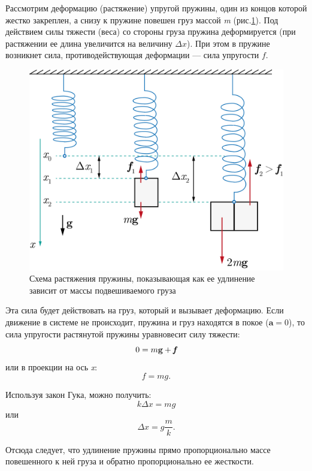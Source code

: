 \documentclass[All.tex]{subfiles}
\begin{document}
Рассмотрим деформацию (растяжение) упругой пружины, один из концов которой жестко закреплен, а снизу к пружине повешен груз массой \textit{m} (рис.\ref{Hooke-3}).
Под действием силы тяжести (веса) со стороны груза пружина деформируется (при растяжении ее длина увеличится на величину $ \Delta x $).
При этом в пружине возникнет сила, противодействующая деформации — сила упругости $ f $.

\begin{figure}[H] 
	\centering 	
	\includegraphics[width=0.6\linewidth]{Hooke-3.png}
	\caption{Схема растяжения пружины, показывающая как ее удлинение зависит от массы подвешиваемого груза}
	\label{Hooke-3}
\end{figure}

Эта сила будет действовать на груз, который и вызывает деформацию.
Если движение в системе не происходит, пружина и груз находятся в покое ($ \textbf{a}=0 $), то сила упругости растянутой пружины уравновесит силу тяжести:
\begin{equation}\label{Hooke-1eq2}
0=m\textbf{g}+ \textit{\textbf{f}}
\end{equation}
или в проекции на ось \textit{x}:
\begin{equation}
f=mg.
\end{equation}

Используя закон Гука, можно получить:
\begin{equation}\label{Hooke-1eq3}
k\Delta x=mg
\end{equation}
или
\begin{equation}\label{Hooke-1eq4}
\Delta x = g\frac mk.
\end{equation}

Отсюда следует, что удлинение пружины прямо пропорционально массе повешенного к ней груза и обратно пропорционально ее жесткости.
\end{document}
